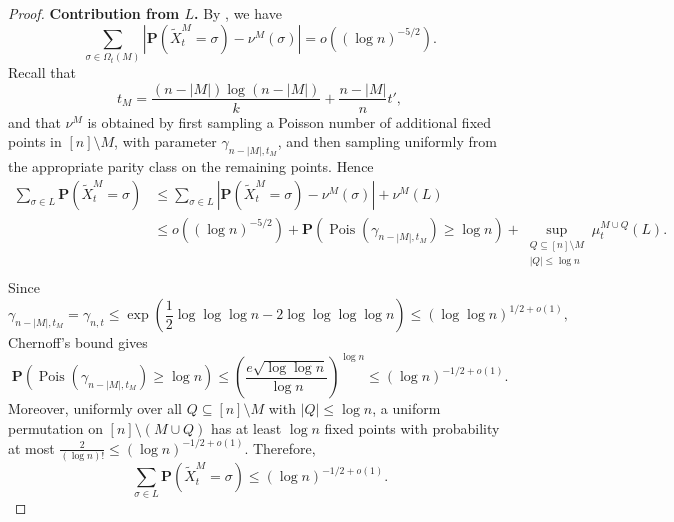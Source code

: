 \begin{proof}
    \medskip
    \noindent
    \textbf{Contribution from $L$.}
    By , we have
    $$
        \sum_{\sigma\in \Omega_t(M)}
        \left|
        \mathbf P(\widetilde X_t^M=\sigma)-\nu^M(\sigma)
        \right|
        =
        o\left((\log n)^{-5/2}\right).
    $$
    Recall that
    $$
        t_M=\frac{(n-|M|)\log(n-|M|)}{k}
        +\frac{n-|M|}{n}t',
    $$
    and that $\nu^M$ is obtained by first sampling a Poisson number of additional
    fixed points in $[n]\setminus M$, with parameter $\gamma_{n-|M|,t_M}$, and then
    sampling uniformly from the appropriate parity class on the remaining points.
    Hence
    \begin{align*}
        \sum_{\sigma\in L}\mathbf P(\widetilde X_t^M=\sigma)
        &\leq
        \sum_{\sigma\in L}
        \left|
        \mathbf P(\widetilde X_t^M=\sigma)-\nu^M(\sigma)
        \right|
        +\nu^M(L) \\
        &\leq
        o\left((\log n)^{-5/2}\right)
        +
        \mathbf P\left(\operatorname{Pois}(\gamma_{n-|M|,t_M})\geq \log n\right) +
        \sup_{\substack{Q\subseteq [n]\setminus M\\ |Q|\leq \log n}}
        \mu_t^{M\cup Q}(L).\\
    \end{align*}
    Since
    $$
        \gamma_{n-|M|,t_M}
        =
        \gamma_{n,t}
        \leq
        \exp\left(
        \frac{1}{2}\log\log\log n
        -2\log\log\log\log n
        \right)
        \leq
        (\log\log n)^{1/2+o(1)},
    $$
    Chernoff's bound gives
    $$
        \mathbf P\left(\operatorname{Pois}(\gamma_{n-|M|,t_M})\geq \log n\right)
        \leq
        \left(
        \frac{e\sqrt{\log\log n}}{\log n}
        \right)^{\log n}
        \leq
        (\log n)^{-1/2+o(1)}.
    $$
    Moreover, uniformly over all $Q\subseteq [n]\setminus M$ with $|Q|\leq \log n$, a uniform permutation on $[n]\setminus (M\cup Q)$ has at least $\log n$ fixed
    points with probability at most $
    \frac{2}{(\log n)!}\leq(\log n)^{-1/2+o(1)}$. Therefore,
    $$
        \sum_{\sigma\in L}\mathbf P(\widetilde X_t^M=\sigma)
        \leq
        (\log n)^{-1/2+o(1)}.
    $$


\end{proof}
